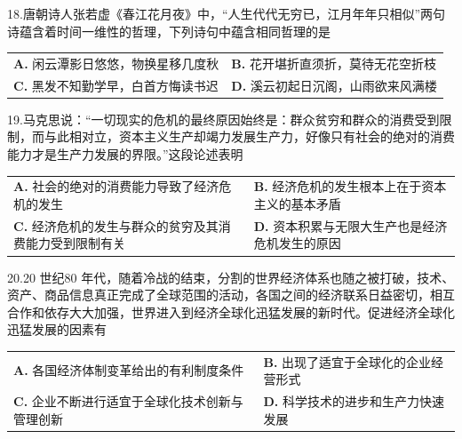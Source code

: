 \documentclass[UTF8,11pt]{ctexart}
\begin{document}
18.唐朝诗人张若虚《春江花月夜》中，“人生代代无穷已，江月年年只相似”两句诗蕴含着时间一维性的哲理，下列诗句中蕴含相同哲理的是


\begin{center}\begin{tabular}{>{\raggedright\arraybackslash}p{\dimexpr(\linewidth-4\tabcolsep)/2\relax}>{\raggedright\arraybackslash}p{\dimexpr(\linewidth-4\tabcolsep)/2\relax}}
\textbf{A.} 闲云潭影日悠悠，物换星移几度秋 & \textbf{B.} 花开堪折直须折，莫待无花空折枝\\[.35em]
\textbf{C.} 黑发不知勤学早，白首方悔读书迟 & \textbf{D.} 溪云初起日沉阁，山雨欲来风满楼\\[.35em]\end{tabular}\end{center}

19.马克思说：“一切现实的危机的最终原因始终是：群众贫穷和群众的消费受到限制，而与此相对立，资本主义生产却竭力发展生产力，好像只有社会的绝对的消费能力才是生产力发展的界限。”这段论述表明


\begin{center}\begin{tabular}{>{\raggedright\arraybackslash}p{\dimexpr(\linewidth-4\tabcolsep)/2\relax}>{\raggedright\arraybackslash}p{\dimexpr(\linewidth-4\tabcolsep)/2\relax}}
\textbf{A.} 社会的绝对的消费能力导致了经济危机的发生 & \textbf{B.} 经济危机的发生根本上在于资本主义的基本矛盾\\[.35em]
\textbf{C.} 经济危机的发生与群众的贫穷及其消费能力受到限制有关 & \textbf{D.} 资本积累与无限大生产也是经济危机发生的原因\\[.35em]\end{tabular}\end{center}

20.20 世纪80 年代，随着冷战的结束，分割的世界经济体系也随之被打破，技术、资产、商品信息真正完成了全球范围的活动，各国之间的经济联系日益密切，相互合作和依存大大加强，世界进入到经济全球化迅猛发展的新时代。促进经济全球化迅猛发展的因素有


\begin{center}\begin{tabular}{>{\raggedright\arraybackslash}p{\dimexpr(\linewidth-4\tabcolsep)/2\relax}>{\raggedright\arraybackslash}p{\dimexpr(\linewidth-4\tabcolsep)/2\relax}}
\textbf{A.} 各国经济体制变革给出的有利制度条件 & \textbf{B.} 出现了适宜于全球化的企业经营形式\\[.35em]
\textbf{C.} 企业不断进行适宜于全球化技术创新与管理创新 & \textbf{D.} 科学技术的进步和生产力快速发展\\[.35em]\end{tabular}\end{center}
\end{document}
